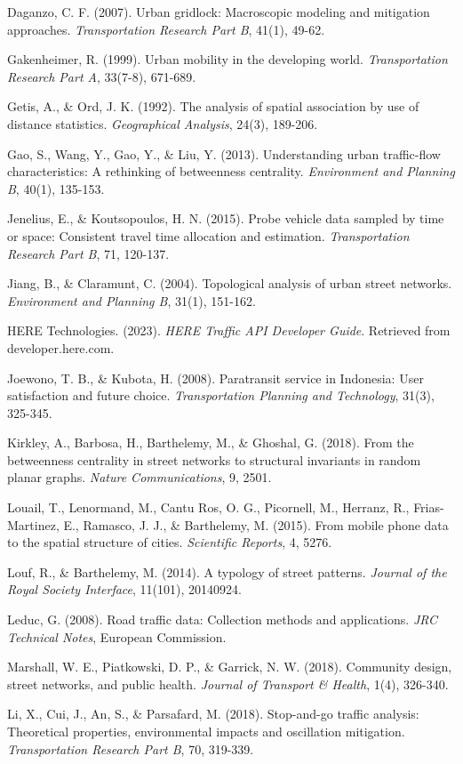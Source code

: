 \documentclass[12pt,a4paper]{article}
\begin{document}
Daganzo, C. F. (2007). Urban gridlock: Macroscopic modeling and mitigation approaches. \emph{Transportation Research Part B}, 41(1), 49-62.

Gakenheimer, R. (1999). Urban mobility in the developing world. \emph{Transportation Research Part A}, 33(7-8), 671-689.

Getis, A., \& Ord, J. K. (1992). The analysis of spatial association by use of distance statistics. \emph{Geographical Analysis}, 24(3), 189-206.

Gao, S., Wang, Y., Gao, Y., \& Liu, Y. (2013). Understanding urban traffic-flow characteristics: A rethinking of betweenness centrality. \emph{Environment and Planning B}, 40(1), 135-153.

Jenelius, E., \& Koutsopoulos, H. N. (2015). Probe vehicle data sampled by time or space: Consistent travel time allocation and estimation. \emph{Transportation Research Part B}, 71, 120-137.

Jiang, B., \& Claramunt, C. (2004). Topological analysis of urban street networks. \emph{Environment and Planning B}, 31(1), 151-162.

HERE Technologies. (2023). \emph{HERE Traffic API Developer Guide}. Retrieved from developer.here.com.

Joewono, T. B., \& Kubota, H. (2008). Paratransit service in Indonesia: User satisfaction and future choice. \emph{Transportation Planning and Technology}, 31(3), 325-345.

Kirkley, A., Barbosa, H., Barthelemy, M., \& Ghoshal, G. (2018). From the betweenness centrality in street networks to structural invariants in random planar graphs. \emph{Nature Communications}, 9, 2501.

Louail, T., Lenormand, M., Cantu Ros, O. G., Picornell, M., Herranz, R., Frias-Martinez, E., Ramasco, J. J., \& Barthelemy, M. (2015). From mobile phone data to the spatial structure of cities. \emph{Scientific Reports}, 4, 5276.

Louf, R., \& Barthelemy, M. (2014). A typology of street patterns. \emph{Journal of the Royal Society Interface}, 11(101), 20140924.

Leduc, G. (2008). Road traffic data: Collection methods and applications. \emph{JRC Technical Notes}, European Commission.

Marshall, W. E., Piatkowski, D. P., \& Garrick, N. W. (2018). Community design, street networks, and public health. \emph{Journal of Transport \& Health}, 1(4), 326-340.

Li, X., Cui, J., An, S., \& Parsafard, M. (2018). Stop-and-go traffic analysis: Theoretical properties, environmental impacts and oscillation mitigation. \emph{Transportation Research Part B}, 70, 319-339.
\end{document}
